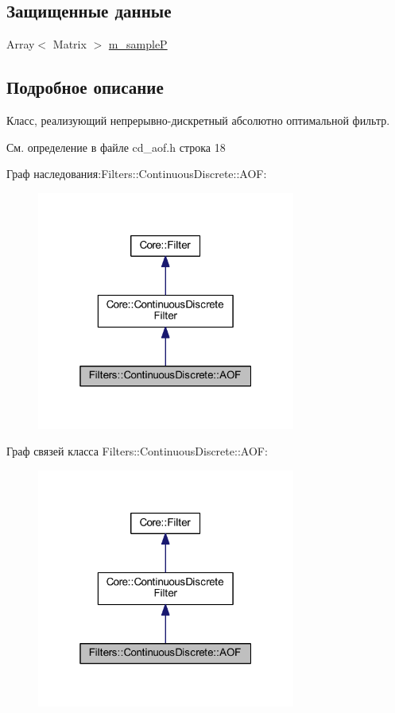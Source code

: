 \subsection*{Защищенные данные}
\begin{DoxyCompactItemize}
\item 
Array$<$ Matrix $>$ \hyperlink{class_filters_1_1_continuous_discrete_1_1_a_o_f_a31111852e94dab62675d8692a4c22df1}{m\+\_\+sampleP}
\end{DoxyCompactItemize}


\subsection{Подробное описание}
Класс, реализующий непрерывно-\/дискретный абсолютно оптимальной фильтр. 

См. определение в файле cd\+\_\+aof.\+h строка 18



Граф наследования\+:Filters\+:\+:Continuous\+Discrete\+:\+:A\+OF\+:
\nopagebreak
\begin{figure}[H]
\begin{center}
\leavevmode
\includegraphics[width=241pt]{class_filters_1_1_continuous_discrete_1_1_a_o_f__inherit__graph}
\end{center}
\end{figure}


Граф связей класса Filters\+:\+:Continuous\+Discrete\+:\+:A\+OF\+:
\nopagebreak
\begin{figure}[H]
\begin{center}
\leavevmode
\includegraphics[width=241pt]{class_filters_1_1_continuous_discrete_1_1_a_o_f__coll__graph}
\end{center}
\end{figure}


